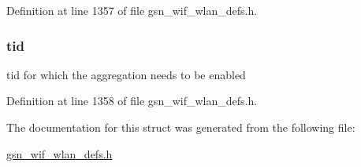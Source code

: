 Definition at line 1357 of file gsn\_\-wif\_\-wlan\_\-defs.h.

\hypertarget{a00367_abf69ed815c8482f9995e41bc0aff9043}{
\subsubsection[{tid}]{ {\bf tid}}}
\label{a00367_abf69ed815c8482f9995e41bc0aff9043}
tid for which the aggregation needs to be enabled 

Definition at line 1358 of file gsn\_\-wif\_\-wlan\_\-defs.h.



The documentation for this struct was generated from the following file:\begin{DoxyCompactItemize}
\item 
\hyperlink{a00613}{gsn\_\-wif\_\-wlan\_\-defs.h}\end{DoxyCompactItemize}
